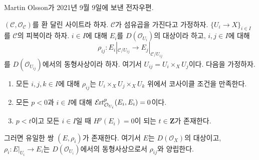 \begin{lemma}
\label{lemma-bbd-glueing-cech}
\begin{reference}
Martin Olsson가 2021년 9월 9일에 보낸 전자우편.
\end{reference}
$(\mathcal{C}, \mathcal{O}_\mathcal{C})$를 환 달린 사이트라 하자.
$\mathcal{C}$가 섬유곱을 가진다고 가정하자.
$\{U_i \to X\}_{i \in I}$를 $\mathcal{C}$의 피복이라 하자.
$i \in I$에 대해 $E_i$를 $D(\mathcal{O}_{U_i})$의 대상이라 하고,
$i, j \in I$에 대해
$$
\rho_{ij} : E_i|_{\mathcal{C}/U_{ij}} \longrightarrow E_j|_{\mathcal{C}/U_{ij}}
$$
를 $D(\mathcal{O}_{U_{ij}})$에서의 동형사상이라 하자. 여기서
$U_{ij} = U_i \times_X U_j$이다. 다음을 가정하자.
\begin{enumerate}
\item 모든 $i, j, k \in I$에 대해 $\rho_{ij}$는
$U_i \times_X U_j \times_X U_k$ 위에서 코사이클 조건을 만족한다.
\item 모든 $p < 0$과 $i \in I$에 대해
$\mathop{\mathcal{E}\!\mathit{xt}}\nolimits^p_{\mathcal{O}_{U_i}}(E_i, E_i) = 0$이다.
\item $p < t$이고 모든 $i \in I$일 때
$H^p(E_i) = 0$이 되는 $t \in \mathbf{Z}$가 존재한다.
\end{enumerate}
그러면 유일한 쌍 $(E, \rho_i)$가 존재한다. 여기서 $E$는
$D(\mathcal{O}_X)$의 대상이고,
$\rho_i : E|_{U_i} \to E_i$는 $D(\mathcal{O}_{U_i})$에서의 동형사상으로서
$\rho_{ij}$와 양립한다.
\end{lemma}

